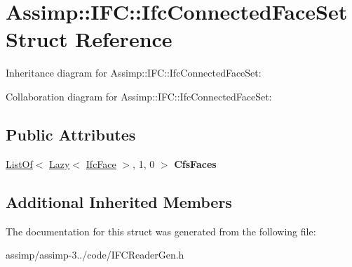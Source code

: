 \hypertarget{struct_assimp_1_1_i_f_c_1_1_ifc_connected_face_set}{\section{Assimp\+:\+:I\+F\+C\+:\+:Ifc\+Connected\+Face\+Set Struct Reference}
\label{struct_assimp_1_1_i_f_c_1_1_ifc_connected_face_set}
}


Inheritance diagram for Assimp\+:\+:I\+F\+C\+:\+:Ifc\+Connected\+Face\+Set\+:


Collaboration diagram for Assimp\+:\+:I\+F\+C\+:\+:Ifc\+Connected\+Face\+Set\+:
\subsection*{Public Attributes}
\begin{DoxyCompactItemize}
\item 
\hypertarget{struct_assimp_1_1_i_f_c_1_1_ifc_connected_face_set_a242e119db88795944a89e056568c3fe0}{\hyperlink{struct_assimp_1_1_s_t_e_p_1_1_list_of}{List\+Of}$<$ \hyperlink{struct_assimp_1_1_s_t_e_p_1_1_lazy}{Lazy}$<$ \hyperlink{struct_assimp_1_1_i_f_c_1_1_ifc_face}{Ifc\+Face} $>$, 1, 0 $>$ {\bfseries Cfs\+Faces}}\label{struct_assimp_1_1_i_f_c_1_1_ifc_connected_face_set_a242e119db88795944a89e056568c3fe0}

\end{DoxyCompactItemize}
\subsection*{Additional Inherited Members}


The documentation for this struct was generated from the following file\+:\begin{DoxyCompactItemize}
\item 
assimp/assimp-\/3../code/I\+F\+C\+Reader\+Gen.\+h\end{DoxyCompactItemize}
